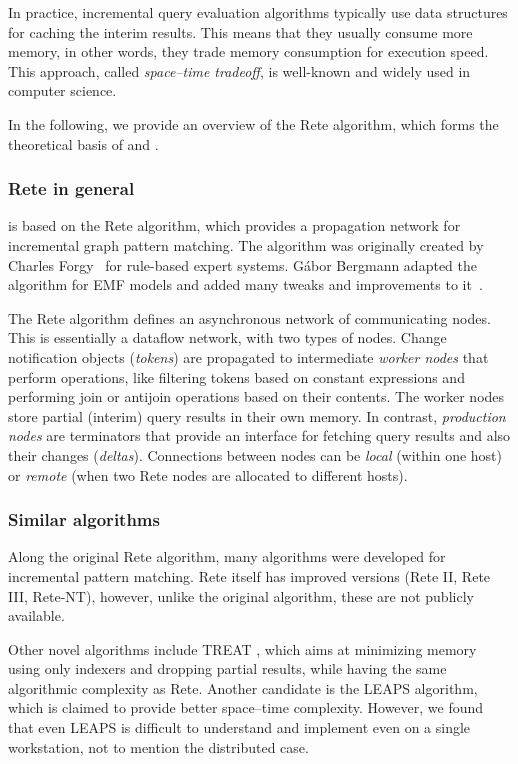In practice, incremental query evaluation algorithms typically use data structures for caching the interim results. This  means that they usually consume more memory, in other words, they trade memory consumption for execution speed. This approach, called \emph{space--time tradeoff}, is well-known and widely used in computer science.

In the following, we provide an overview of the Rete algorithm, which forms the theoretical basis of \eiq{} and \iqd{}.

\subsubsection{Rete in general}
\label{subsubsec:rete}

\iqd{} is based on the Rete algorithm, which provides a propagation network for incremental graph pattern matching. The algorithm was originally created by Charles Forgy~\cite{Forgy} for rule-based expert systems. Gábor Bergmann adapted the algorithm for EMF models and added many tweaks and improvements to it~\cite{BergmannRete}.

The Rete algorithm defines an asynchronous network of communicating nodes. This is essentially a dataflow network, with two types of nodes. Change notification objects (\emph{tokens}) are propagated to intermediate \emph{worker nodes} that perform operations, like filtering tokens based on constant expressions and performing join or antijoin operations based on their contents. The worker nodes store partial (interim) query results in their own memory. In contrast, \emph{production nodes} are terminators that provide an interface for fetching query results and also their changes (\emph{deltas}). Connections between nodes can be \emph{local} (within one host) or \emph{remote} (when two Rete nodes are allocated to different hosts).

\subsubsection{Similar algorithms}

Along the original Rete algorithm, many algorithms were developed for incremental pattern matching. Rete itself has improved versions (Rete II, Rete III, Rete-NT), however, unlike the original algorithm, these are not publicly available. 

Other novel algorithms include TREAT \cite{Miranker:1991:OPT:627280.627434}, which aims at minimizing memory using only indexers and dropping partial results, while having the same algorithmic complexity as Rete. Another candidate is the LEAPS \cite{Batory:1994:LA:899216} algorithm, which is claimed to provide better space--time complexity. However, we found that even LEAPS is difficult to understand and implement even on a single workstation, not to mention the distributed case. 

